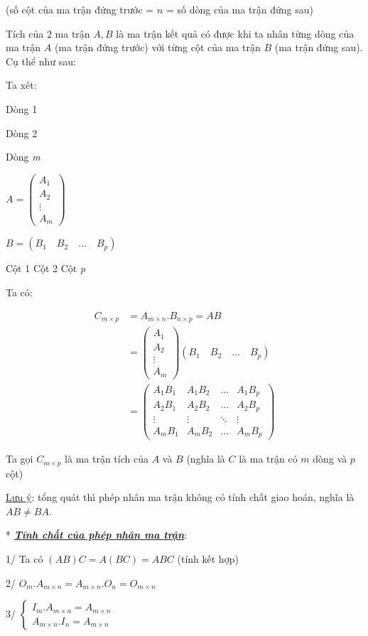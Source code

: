 \documentclass[12pt,a4paper]{article} \usepackage[utf8]{inputenc} \usepackage[T5]{fontenc} \usepackage[vietnamese]{babel} \usepackage{amsmath, amssymb, amsfonts} \usepackage{ulem}
\begin{document}
(số cột của ma trận đứng trước = $n$ = số dòng của ma trận đứng sau)

Tích của 2 ma trận $A, B$ là ma trận kết quả có được khi ta nhân từng dòng của ma trận $A$ (ma trận đứng trước) với từng cột của ma trận $B$ (ma trận đứng sau). Cụ thể như sau:

Ta xét:

Dòng 1

Dòng 2

Dòng \emph{m}

$A = \begin{pmatrix} A_1 \\ A_2 \\ \vdots \\ A_m \end{pmatrix}$

$B = (B_1 \quad B_2 \quad \ldots \quad B_p)$

Cột 1 Cột 2 Cột \emph{p}

Ta có:

\begin{align*}
C_{m \times p} &= A_{m \times n}.B_{n \times p} = AB \\
&= \begin{pmatrix} A_1 \\ A_2 \\ \vdots \\ A_m \end{pmatrix} (B_1 \quad B_2 \quad \ldots \quad B_p) \\
&= \begin{pmatrix} A_1B_1 & A_1B_2 & \ldots & A_1B_p \\ A_2B_1 & A_2B_2 & \ldots & A_2B_p \\ \vdots & \vdots & \ddots & \vdots \\ A_mB_1 & A_mB_2 & \ldots & A_mB_p \end{pmatrix}
\end{align*}

Ta gọi $C_{m \times p}$ là ma trận tích của $A$ và $B$ (nghĩa là $C$ là ma trận có $m$ dòng và $p$ cột)

\ul{Lưu ý}: tổng quát thì phép nhân ma trận không có tính chất giao
hoán, nghĩa là $AB \neq BA$.

* \emph{\textbf{\ul{Tính chất của phép nhân ma trận}}}:

1/ Ta có $(AB)C = A(BC) = ABC$ (tính kết hợp)

2/ $O_m.A_{m \times n} = A_{m \times n}.O_n = O_{m \times n}$

3/ $\begin{cases} I_m.A_{m \times n} = A_{m \times n} \\ A_{m \times n}.I_n = A_{m \times n} \end{cases}$
\end{document}
